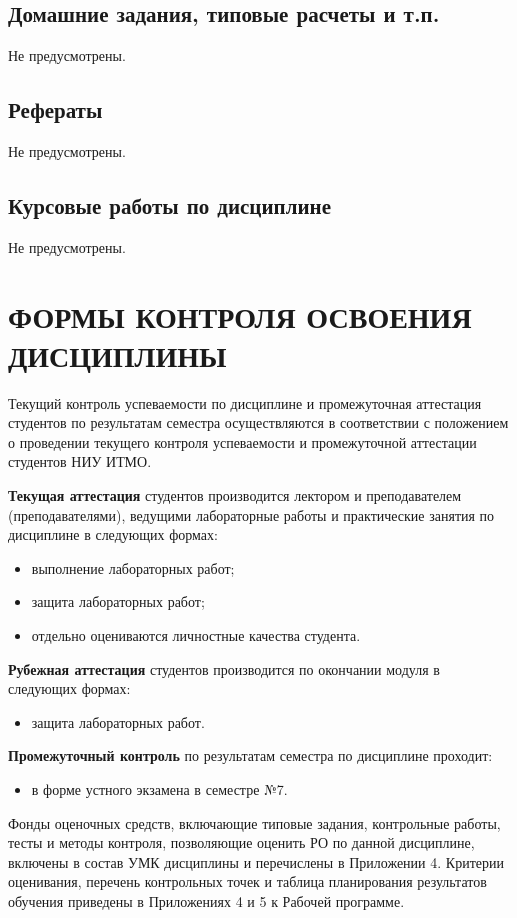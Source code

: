 \subsection{Домашние задания, типовые расчеты и т.п.}
Не предусмотрены.

\subsection{Рефераты}
Не предусмотрены.

\subsection{Курсовые работы по дисциплине}
Не предусмотрены.

\newpage
\section{ФОРМЫ КОНТРОЛЯ ОСВОЕНИЯ ДИСЦИПЛИНЫ}

Текущий контроль успеваемости по дисциплине и промежуточная аттестация студентов по результатам семестра осуществляются в соответствии с положением о проведении текущего контроля успеваемости и промежуточной аттестации студентов НИУ ИТМО.

\textbf{Текущая аттестация} студентов производится лектором и преподавателем (преподавателями), ведущими лабораторные работы и практические занятия по дисциплине в следующих формах:
\begin{itemize}


\item выполнение лабораторных работ;
\item защита лабораторных работ;
\item отдельно оцениваются личностные качества студента.
\end{itemize}

\textbf{Рубежная аттестация} студентов производится по окончании модуля в следующих формах:
\begin{itemize}
\item защита лабораторных работ.
\end{itemize}

\textbf{Промежуточный контроль} по результатам семестра по дисциплине проходит:
\begin{itemize}
\item в форме устного экзамена в семестре №7.
\end{itemize}

Фонды оценочных средств, включающие типовые задания, контрольные работы, тесты и методы контроля, позволяющие оценить РО по данной дисциплине, включены в состав УМК дисциплины и перечислены в Приложении 4.
Критерии оценивания, перечень контрольных точек и таблица планирования результатов обучения приведены в Приложениях 4 и 5 к Рабочей программе.


